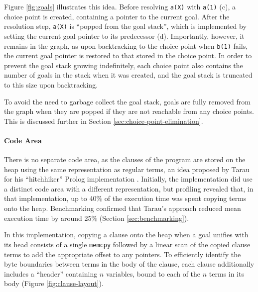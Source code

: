 Figure \ref{fig:goals} illustrates this idea. Before resolving \texttt{a(X)} with \texttt{a(1)} (c), a choice point is created, containing a pointer to the current goal. After the resolution step, \texttt{a(X)} is ``popped from the goal stack'', which is implemented by setting the current goal pointer to its predecessor (d). Importantly, however, it remains in the graph, as upon backtracking to the choice point when \texttt{b(1)} fails, the current goal pointer is restored to that stored in the choice point. In order to prevent the goal stack growing indefinitely, each choice point also contains the number of goals in the stack when it was created, and the goal stack is truncated to this size upon backtracking.

To avoid the need to garbage collect the goal stack, goals are fully removed from the graph when they are popped if they are not reachable from any choice points. This is discussed further in Section \ref{sec:choice-point-elimination}.

\paragraph{Code Area} There is no separate code area, as the clauses of the program are stored on the heap using the same representation as regular terms, an idea proposed by Tarau for his ``hitchhiker'' Prolog implementation \cite{tarauHitchhikersGuideReinventing2018}. Initially, the implementation did use a distinct code area with a different representation, but profiling revealed that, in that implementation, up to 40\% of the execution time was spent copying terms onto the heap. Benchmarking confirmed that Tarau's approach reduced mean execution time by around 25\% (Section \ref{sec:benchmarking}).

In this implementation, copying a clause onto the heap when a goal unifies with its head consists of a single \texttt{memcpy} followed by a linear scan of the copied clause terms to add the appropriate offset to any pointers. To efficiently identify the byte boundaries between terms in the body of the clause, each clause additionally includes a ``header'' containing $n$ variables, bound to each of the $n$ terms in its body (Figure \ref{fig:clause-layout}).

